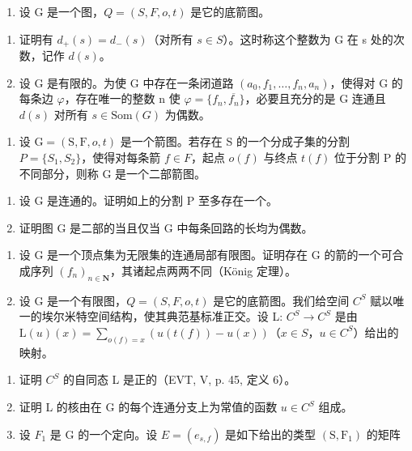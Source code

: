 \exercisegroup

\begin{enumerate}
\def\labelenumi{\arabic{enumi})}
\item
  设 G 是一个图，\(Q = (S, F, o, t)\) 是它的底箭图。
\end{enumerate}

\begin{enumerate}
\def\labelenumi{\alph{enumi})}
\item
  证明有 \(d_{+}(s) = d_{-}(s)\)（对所有 \(s \in S\)）。这时称这个整数为 G 在 s 处的次数，记作 \(d(s)\)。
\item
  设 G 是有限的。为使 G 中存在一条闭道路 \((a_{0}, f_{1}, \ldots, f_{n}, a_{n})\)，使得对 G 的每条边 \(\varphi\)，存在唯一的整数 n 使 \(\varphi = \{f_{n}, \overline{f_{n}}\}\)，必要且充分的是 G 连通且 \(d(s)\) 对所有 \(s \in \text{Som}(G)\) 为偶数。
\end{enumerate}

\begin{enumerate}
\def\labelenumi{\arabic{enumi})}
\setcounter{enumi}{1}
\tightlist
\item
  设 \(\mathrm{G} = (\mathrm{S}, \mathrm{F}, o, t)\) 是一个箭图。若存在 S 的一个分成子集的分割 \(P = \{S_{1}, S_{2}\}\)，使得对每条箭 \(f \in F\)，起点 \(o(f)\) 与终点 \(t(f)\) 位于分割 P 的不同部分，则称 G 是一个二部箭图。
\end{enumerate}

\begin{enumerate}
\def\labelenumi{\alph{enumi})}
\item
  设 G 是连通的。证明如上的分割 P 至多存在一个。
\item
  证明图 G 是二部的当且仅当 G 中每条回路的长均为偶数。
\end{enumerate}

\begin{enumerate}
\def\labelenumi{\arabic{enumi})}
\setcounter{enumi}{2}
\item
  设 G 是一个顶点集为无限集的连通局部有限图。证明存在 G 的箭的一个可合成序列 \((f_{n})_{n\in\mathbf{N}}\)，其诸起点两两不同（König 定理）。
\item
  设 G 是一个有限图，\(Q = (S, F, o, t)\) 是它的底箭图。我们给空间 \(C^{S}\) 赋以唯一的埃尔米特空间结构，使其典范基标准正交。设 L: \(C^{S} \to C^{S}\) 是由 \(\mathrm{L}(u)(x) = \sum_{o(f)=x} (u(t(f)) - u(x))\)（\(x \in S\)，\(u \in C^{S}\)）给出的映射。
\end{enumerate}

\begin{enumerate}
\def\labelenumi{\alph{enumi})}
\item
  证明 \(C^{S}\) 的自同态 L 是正的（EVT, V, p. 45, 定义 6）。
\item
  证明 L 的核由在 G 的每个连通分支上为常值的函数 \(u \in C^{S}\) 组成。
\item
  设 \(F_{1}\) 是 G 的一个定向。设 \(E = (e_{s,f})\) 是如下给出的类型 \((\mathrm{S}, \mathrm{F}_{1})\) 的矩阵
\end{enumerate}

